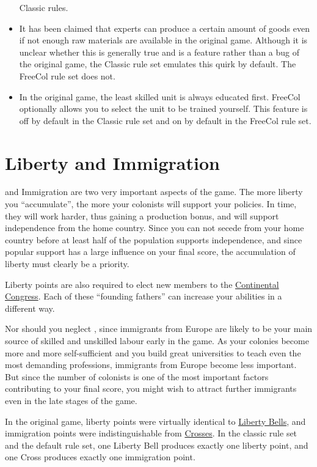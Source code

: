 \documentclass[12pt]{book}
\begin{document}
\begin{itemize}
  Classic rules.
\item It has been claimed that experts can produce a certain amount of
  goods even if not enough raw materials are available in the original
  game. Although it is unclear whether this is generally true and is a
  feature rather than a bug of the original game, the Classic rule set
  emulates this quirk by default. The FreeCol rule set does not.
\item In the original game, the least skilled unit is always educated
  first. FreeCol optionally allows you to select the unit to be
  trained yourself. This feature is off by default in the Classic
  rule set and on by default in the FreeCol rule set.
\end{itemize}


\hypertarget{Liberty and Immigration}{\section{Liberty and Immigration}}

 and Immigration are two very important aspects of
the game. The more liberty you ``accumulate'', the more your colonists
will support your policies. In time, they will work harder, thus
gaining a production bonus, and will support independence from the
home country. Since you can not secede from your home country before
at least half of the population supports independence, and since
popular support has a large influence on your final score, the
accumulation of liberty must clearly be a priority.

Liberty points are also required to elect new members to the
\hyperlink{Continental Congress}{Continental Congress}. Each of these
``founding fathers'' can increase your abilities in a different way.

Nor should you neglect , since immigrants from
Europe are likely to be your main source of skilled and unskilled
labour early in the game. As your colonies become more and more
self-sufficient and you build great universities to teach even the
most demanding professions, immigrants from Europe become less
important. But since the number of colonists is one of the most
important factors contributing to your final score, you might wish to
attract further immigrants even in the late stages of the game.

In the original game, liberty points were virtually identical to
\hyperlink{Liberty Bells}{Liberty Bells}, and immigration points were
indistinguishable from \hyperlink{Crosses}{Crosses}. In the classic
rule set and the default rule set, one Liberty Bell produces exactly
one liberty point, and one Cross produces exactly one immigration
point.
\end{document}
